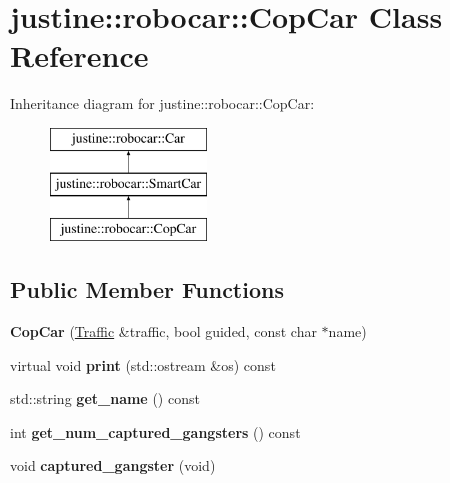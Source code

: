 \hypertarget{classjustine_1_1robocar_1_1CopCar}{\section{justine\-:\-:robocar\-:\-:Cop\-Car Class Reference}
\label{classjustine_1_1robocar_1_1CopCar}
}
Inheritance diagram for justine\-:\-:robocar\-:\-:Cop\-Car\-:\begin{figure}[H]
\begin{center}
\leavevmode
\includegraphics[height=3.000000cm]{classjustine_1_1robocar_1_1CopCar}
\end{center}
\end{figure}
\subsection*{Public Member Functions}
\begin{DoxyCompactItemize}
\item 
\hypertarget{classjustine_1_1robocar_1_1CopCar_a1fd71f225b51069993fa896387a0c3c6}{{\bfseries Cop\-Car} (\hyperlink{classjustine_1_1robocar_1_1Traffic}{Traffic} \&traffic, bool guided, const char $\ast$name)}\label{classjustine_1_1robocar_1_1CopCar_a1fd71f225b51069993fa896387a0c3c6}

\item 
\hypertarget{classjustine_1_1robocar_1_1CopCar_aa47580db59f0cb892d5649769de08999}{virtual void {\bfseries print} (std\-::ostream \&os) const }\label{classjustine_1_1robocar_1_1CopCar_aa47580db59f0cb892d5649769de08999}

\item 
\hypertarget{classjustine_1_1robocar_1_1CopCar_a3e008915c7295de23793f8bccad3ff4a}{std\-::string {\bfseries get\-\_\-name} () const }\label{classjustine_1_1robocar_1_1CopCar_a3e008915c7295de23793f8bccad3ff4a}

\item 
\hypertarget{classjustine_1_1robocar_1_1CopCar_a50060362f00b3a82bab7590350c5fbca}{int {\bfseries get\-\_\-num\-\_\-captured\-\_\-gangsters} () const }\label{classjustine_1_1robocar_1_1CopCar_a50060362f00b3a82bab7590350c5fbca}

\item 
\hypertarget{classjustine_1_1robocar_1_1CopCar_acc9888c1b4b288543ca3c4df9767d34f}{void {\bfseries captured\-\_\-gangster} (void)}\label{classjustine_1_1robocar_1_1CopCar_acc9888c1b4b288543ca3c4df9767d34f}

\end{DoxyCompactItemize}
